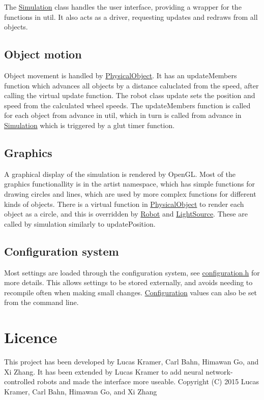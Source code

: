 The \hyperlink{classSimulation}{Simulation} class handles the user interface, providing a wrapper for the functions in util. It also acts as a driver, requesting updates and redraws from all objects. \hypertarget{index_Motion}{}\subsection{Object motion}\label{index_Motion}
Object movement is handled by \hyperlink{classPhysicalObject}{Physical\-Object}. It has an update\-Members function which advances all objects by a distance caluclated from the speed, after calling the virtual update function. The robot class update sets the position and speed from the calculated wheel speeds. The update\-Members function is called for each object from advance in util, which in turn is called from advance in \hyperlink{classSimulation}{Simulation} which is triggered by a glut timer function. \hypertarget{index_Graphics}{}\subsection{Graphics}\label{index_Graphics}
A graphical display of the simulation is rendered by Open\-G\-L. Most of the graphics functionallity is in the artist namespace, which has simple functions for drawing circles and lines, which are used by more complex functions for different kinds of objects. There is a virtual function in \hyperlink{classPhysicalObject}{Physical\-Object} to render each object as a circle, and this is overridden by \hyperlink{classRobot}{Robot} and \hyperlink{classLightSource}{Light\-Source}. These are called by simulation similarly to update\-Position. \hypertarget{index_Configuration}{}\subsection{Configuration system}\label{index_Configuration}
Most settings are loaded through the configuration system, see \hyperlink{configuration_8h}{configuration.\-h} for more details. This allows settings to be stored externally, and avoids needing to recompile often when making small changes. \hyperlink{classConfiguration}{Configuration} values can also be set from the command line.\hypertarget{index_Licence}{}\section{Licence}\label{index_Licence}
This project has been developed by Lucas Kramer, Carl Bahn, Himawan Go, and Xi Zhang. It has been extended by Lucas Kramer to add neural network-\/controlled robots and made the interface more useable. Copyright (C) 2015 Lucas Kramer, Carl Bahn, Himawan Go, and Xi Zhang

